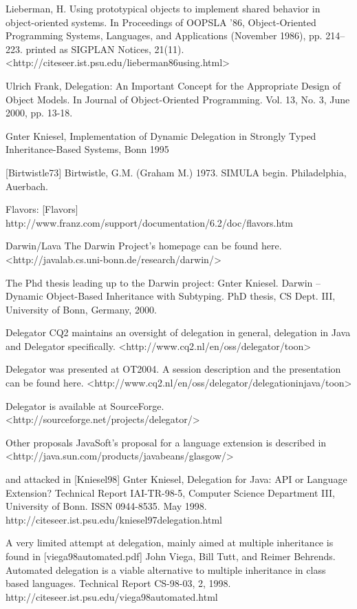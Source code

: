 \documentclass[a4paper,12pt]{book}
\begin{document}
Lieberman, H. Using prototypical objects to implement shared behavior in object-oriented systems. In Proceedings of OOPSLA '86, Object-Oriented Programming Systems, Languages, and Applications (November 1986), pp. 214--223. printed as SIGPLAN Notices, 21(11). <http://citeseer.ist.psu.edu/lieberman86using.html>

Ulrich Frank, Delegation: An Important Concept for the Appropriate Design of Object Models. In Journal of Object-Oriented Programming. Vol. 13, No. 3, June 2000, pp. 13-18.

Gnter Kniesel, Implementation of Dynamic Delegation in Strongly Typed Inheritance-Based Systems, Bonn 1995

[Birtwistle73] Birtwistle, G.M. (Graham M.) 1973. SIMULA begin. Philadelphia, Auerbach.

Flavors:
[Flavors] http://www.franz.com/support/documentation/6.2/doc/flavors.htm

Darwin/Lava
The Darwin Project's homepage can be found here.
<http://javalab.cs.uni-bonn.de/research/darwin/>

The Phd thesis leading up to the Darwin project:
Gnter Kniesel. Darwin -- Dynamic Object-Based Inheritance with Subtyping. PhD thesis, CS Dept. III, University of Bonn, Germany, 2000.

Delegator
CQ2 maintains an oversight of delegation in general, delegation in Java and Delegator specifically.
<http://www.cq2.nl/en/oss/delegator/toon>

Delegator was presented at OT2004. A session description and the presentation can be found here.
<http://www.cq2.nl/en/oss/delegator/delegationinjava/toon>

Delegator is available at SourceForge.
<http://sourceforge.net/projects/delegator/>

Other proposals
JavaSoft's proposal for a language extension is described in
<http://java.sun.com/products/javabeans/glasgow/>

and attacked in
[Kniesel98] Gnter Kniesel, Delegation for Java: API or Language Extension? Technical Report IAI-TR-98-5, Computer Science Department III, University of Bonn. ISSN 0944-8535. May 1998.  http://citeseer.ist.psu.edu/kniesel97delegation.html

A very limited attempt at delegation, mainly aimed at multiple inheritance is found in
[viega98automated.pdf] John Viega, Bill Tutt, and Reimer Behrends. Automated delegation is a viable alternative to multiple inheritance in class based languages. Technical Report CS-98-03, 2, 1998. http://citeseer.ist.psu.edu/viega98automated.html
\end{document}
